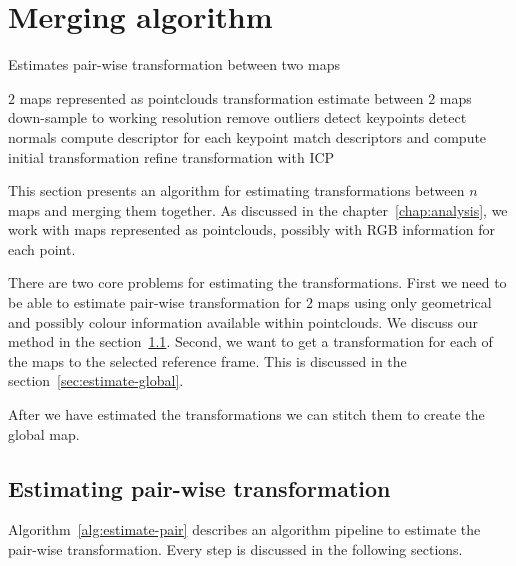 \chapter{Merging algorithm}
\label{chap:mergingalgorithm}


\begin{algorithm}
    \caption[Pair-wise transformation estimation]{Estimates pair-wise transformation between two maps}
    \label{alg:estimate-pair}
    \begin{algorithmic}[1]
        \Require $2$ maps represented as pointclouds
        \Ensure transformation estimate between $2$ maps
            \State down-sample to working resolution
            \State remove outliers
            \State detect keypoints
            \State detect normals
            \State compute descriptor for each keypoint
            \State match descriptors and compute initial transformation
            \State refine transformation with \gls{ICP}
        \EndProcedure
    \end{algorithmic}
\end{algorithm}

This section presents an algorithm for estimating transformations between $n$ maps and merging them together. As discussed in the chapter~\ref{chap:analysis}, we work with maps represented as pointclouds, possibly with \gls{RGB} information for each point.

There are two core problems for estimating the transformations. First we need to be able to estimate pair-wise transformation for $2$ maps using only geometrical and possibly colour information available within pointclouds. We discuss our method in the section~\ref{sec:estimate-pair-wise}. Second, we want to get a transformation for each of the maps to the selected reference frame. This is discussed in the section~\ref{sec:estimate-global}.

After we have estimated the transformations we can stitch them to create the global map.

\section{Estimating pair-wise transformation}
\label{sec:estimate-pair-wise}

Algorithm~\ref{alg:estimate-pair} describes an algorithm pipeline to estimate the pair-wise transformation. Every step is discussed in the following sections.

